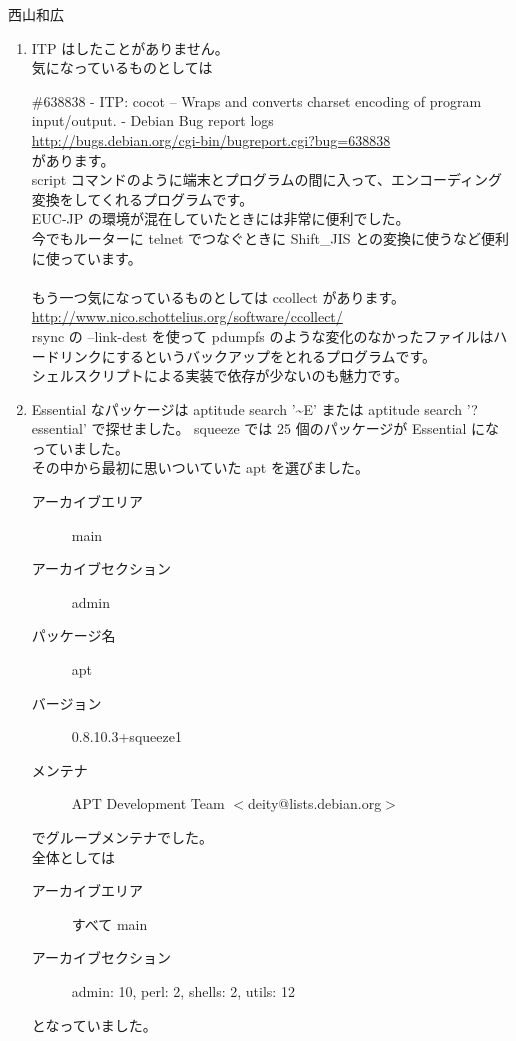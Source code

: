 \documentclass[mingoth,a4paper]{jsarticle}
\begin{document}
\begin{prework}{ 西山和広 }
  \begin{enumerate}
  \item ITP はしたことがありません。\\
    気になっているものとしては

    \#638838 - ITP: cocot -- Wraps and converts charset encoding of program input/output. - Debian Bug report logs\\
    \url{http://bugs.debian.org/cgi-bin/bugreport.cgi?bug=638838}\\
    があります。\\
    script コマンドのように端末とプログラムの間に入って、エンコーディング変換をしてくれるプログラムです。\\
    EUC-JP の環境が混在していたときには非常に便利でした。\\
    今でもルーターに telnet でつなぐときに Shift\_JIS との変換に使うなど便利に使っています。\\
    \\
    もう一つ気になっているものとしては ccollect があります。\\
    \url{http://www.nico.schottelius.org/software/ccollect/}\\
    rsync の --link-dest を使って pdumpfs のような変化のなかったファイルはハードリンクにするというバックアップをとれるプログラムです。\\
    シェルスクリプトによる実装で依存が少ないのも魅力です。
  \item Essential なパッケージは aptitude search '\textasciitilde{}E' または aptitude search '?essential' で探せました。 squeeze では 25 個のパッケージが Essential になっていました。\\
    その中から最初に思いついていた apt を選びました。
    \begin{description}
    \item [アーカイブエリア] main
    \item [アーカイブセクション] admin
    \item [パッケージ名] apt
    \item [バージョン] 0.8.10.3+squeeze1
    \item [メンテナ] APT Development Team $<$deity@lists.debian.org$>$
    \end{description}
    でグループメンテナでした。\\

    全体としては
    \begin{description}
    \item [アーカイブエリア] すべて main
    \item [アーカイブセクション] admin: 10, perl: 2, shells: 2, utils: 12
    \end{description}
    となっていました。
  \end{enumerate}
\end{prework}
\end{document}
